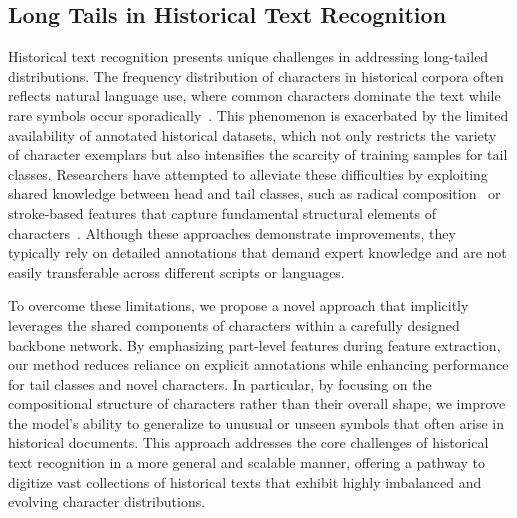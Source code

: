 \subsection{Long Tails in Historical Text Recognition}

Historical text recognition presents unique challenges in addressing long-tailed distributions. The frequency distribution of characters in historical corpora often reflects natural language use, where common characters dominate the text while rare symbols occur sporadically~\cite{yang2022survey}. This phenomenon is exacerbated by the limited availability of annotated historical datasets, which not only restricts the variety of character exemplars but also intensifies the scarcity of training samples for tail classes. Researchers have attempted to alleviate these difficulties by exploiting shared knowledge between head and tail classes, such as radical composition~\cite{obcmk2,sanicdar23,fudanvi} or stroke-based features that capture fundamental structural elements of characters~\cite{taktak}. Although these approaches demonstrate improvements, they typically rely on detailed annotations that demand expert knowledge and are not easily transferable across different scripts or languages.

To overcome these limitations, we propose a novel approach that implicitly leverages the shared components of characters within a carefully designed backbone network. By emphasizing part-level features during feature extraction, our method reduces reliance on explicit annotations while enhancing performance for tail classes and novel characters. In particular, by focusing on the compositional structure of characters rather than their overall shape, we improve the model's ability to generalize to unusual or unseen symbols that often arise in historical documents. This approach addresses the core challenges of historical text recognition in a more general and scalable manner, offering a pathway to digitize vast collections of historical texts that exhibit highly imbalanced and evolving character distributions.

